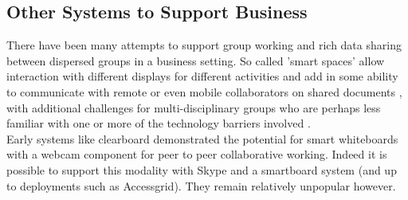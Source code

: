\subsection{Other Systems to Support Business}                  
There have been many attempts to support group working and rich data sharing between dispersed groups in a business setting. So called 'smart spaces' allow interaction with different displays for different activities and add in some ability to communicate with remote or even mobile collaborators on shared documents \cite{Bardram2012}, with additional challenges for multi-disciplinary groups who are perhaps less familiar with one or more of the technology barriers involved \cite{Adamczyk2007}.\\
Early systems like clearboard \cite{Ishii1993} demonstrated the potential for smart whiteboards with a webcam component for peer to peer collaborative working. Indeed it is possible to support this modality with Skype and a smartboard system (and up to deployments such as Accessgrid). They remain relatively unpopular however.\\


